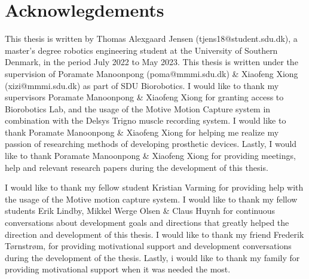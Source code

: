 \documentclass[../main.tex]{subfiles}
\begin{document}
\section*{Acknowlegdements}

This thesis is written by Thomas Alexgaard Jensen (tjens18@student.sdu.dk), a master's degree robotics engineering student at the University of Southern Denmark, in the period July 2022 to May 2023.
This thesis is written under the supervision of Poramate Manoonpong (poma@mmmi.sdu.dk) \& Xiaofeng Xiong (xizi@mmmi.sdu.dk) as part of SDU Biorobotics.
I would like to thank my supervisors Poramate Manoonpong \& Xiaofeng Xiong for granting access to Biorobotics Lab, and the usage of the Motive Motion Capture system in combination with the Delsys Trigno muscle recording system.
I would like to thank Poramate Manoonpong \& Xiaofeng Xiong for helping me realize my passion of researching methods of developing prosthetic devices.
Lastly, I would like to thank Poramate Manoonpong \& Xiaofeng Xiong for providing meetings, help and relevant research papers during the development of this thesis.

I would like to thank my fellow student Kristian Varming for providing help with the usage of the Motive motion capture system.
I would like to thank my fellow students Erik Lindby, Mikkel Werge Olsen \& Claus Huynh for continuous conversations about development goals and directions that greatly helped the direction and development of this thesis.
I would like to thank my friend Frederik Tørnstrøm, for providing motivational support and development conversations during the development of the thesis.
Lastly, i would like to thank my family for providing motivational support when it was needed the most.
\end{document}
